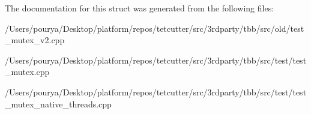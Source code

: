 The documentation for this struct was generated from the following files\+:\begin{DoxyCompactItemize}
\item 
/\+Users/pourya/\+Desktop/platform/repos/tetcutter/src/3rdparty/tbb/src/old/test\+\_\+mutex\+\_\+v2.\+cpp\item 
/\+Users/pourya/\+Desktop/platform/repos/tetcutter/src/3rdparty/tbb/src/test/test\+\_\+mutex.\+cpp\item 
/\+Users/pourya/\+Desktop/platform/repos/tetcutter/src/3rdparty/tbb/src/test/test\+\_\+mutex\+\_\+native\+\_\+threads.\+cpp\end{DoxyCompactItemize}
